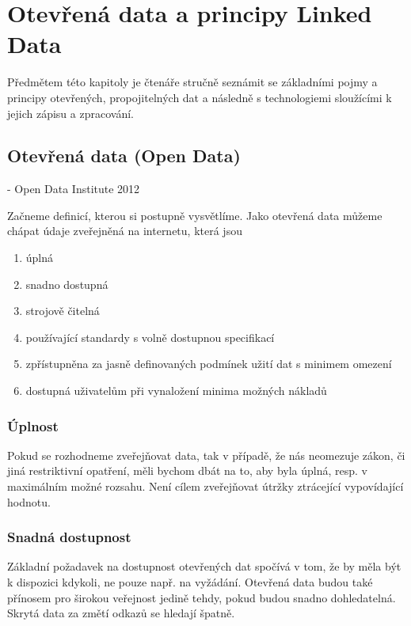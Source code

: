 \chapter{Otevřená data a principy Linked Data}
\label{sec:kap2}

Předmětem této kapitoly je čtenáře stručně seznámit se základními pojmy a principy otevřených, propojitelných dat a následně s technologiemi sloužícími k jejich zápisu a zpracování.

\section{Otevřená data (Open Data)}

\textit{} - Open Data Institute 2012
\newline

Začneme definicí, kterou si postupně vysvětlíme. Jako otevřená data můžeme chápat údaje zveřejněná na internetu, která jsou\cite{mv}

\begin{enumerate}
\item úplná
\item snadno dostupná
\item strojově čitelná
\item používající standardy s volně dostupnou specifikací
\item zpřístupněna za jasně definovaných podmínek užití dat s minimem omezení
\item dostupná uživatelům při vynaložení minima možných nákladů
\end{enumerate}

\subsection*{Úplnost}

Pokud se rozhodneme zveřejňovat data, tak v případě, že nás neomezuje zákon, či jiná restriktivní opatření, měli bychom dbát na to, aby byla úplná, resp. v maximálním možné rozsahu. Není cílem zveřejňovat útržky ztrácející vypovídající hodnotu.

\subsection*{Snadná dostupnost}

Základní požadavek na dostupnost otevřených dat spočívá v tom, že by měla být k dispozici kdykoli, ne pouze např. na vyžádání. Otevřená data budou také přínosem pro širokou veřejnost jedině tehdy, pokud budou snadno dohledatelná. Skrytá data za změtí odkazů se hledají špatně.

